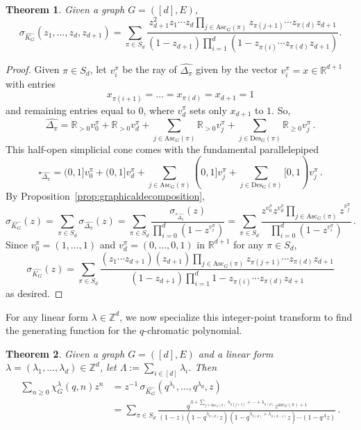 \documentclass[11pt]{amsart}
\newtheorem{theorem}{Theorem}  [section] \numberwithin{equation}{section}
\newcommand{\des}{\mathrm{Des}}
\newcommand{\asc}{\mathrm{Asc}}
\newcommand{\ascnum}{\mathrm{asc}}
\begin{document}
\begin{theorem}\label{thm:multivariablechromaticgenerating}
    Given a graph $G=([d],E)$, 
    \[
        \sigma_{\widehat{K_G}}(z_1,\ldots,z_d,z_{d+1}) = \sum_{\pi \in S_d} \frac{ z_{d+1}^2 z_1 \cdots z_d \prod_{j \in \asc_G(\pi)} z_{\pi(j+1)} \cdots z_{\pi(d)} z_{d+1} }{(1-z_{d+1}) \prod_{i=1}^d (1-z_{\pi(i)} \cdots z_{\pi(d)} z_{d+1})}.
    \]
\end{theorem}

\begin{proof}
    Given $\pi \in S_d$, let $v^\pi_i$ be the ray of $\widehat{\Delta_\pi}$ given by the vector $v^\pi_i=x\in \mathbb{R}^{d+1}$ with entries 
    \[
    x_{\pi(i+1)} =\dots = x_{\pi(d)} = x_{d+1} = 1
    \]
    and remaining entries equal to $0$, where $v^\pi_d$ sets only $x_{d+1}$ to $1$. 
    So, 
        \[
            \widehat{\Delta_\pi} = \mathbb{R}_{>0} v^\pi_0 + \mathbb{R}_{>0} v^\pi_d + \sum_{j \in
            \asc_G(\pi)}\mathbb{R}_{>0} v^\pi_j + \sum_{j \in \des_G(\pi)} \mathbb{R}_{\geq 0} v^\pi_j \, .
        \]
    This half-open simplicial cone comes with the fundamental parallelepiped 
    \[
        \square_{\widehat{\Delta_\pi}} = (0,1] v^\pi_0 + (0,1]v^\pi_d + \sum_{j \in \asc_G(\pi)} (0,1]
        v^\pi_j + \sum_{j \in \des_G(\pi)} [0,1) v^\pi_j  \, .
    \]
    By Proposition~\ref{prop:graphicaldecomposition},
    \[
        \sigma_{\widehat{K_G}}(z) = \sum_{\pi \in S_d} \sigma_{\widehat{\Delta_\pi}}(z) = \sum_{\pi \in S_d}
\frac{\sigma_{\square_{\widehat{\Delta_\pi}}}(z)}{\prod_{i=0}^d (1-z^{v^\pi_i}) } = \sum_{\pi \in S_d}
\frac{z^{v^\pi_0} z^{v^\pi_d} \prod_{j \in \asc_G(\pi)} z^{v^\pi_j}} {\prod_{i=0}^d (1-z^{v^\pi_i}) } \, .
    \]
    Since $v^\pi_0= (1,\ldots,1)$ and $v^\pi_d = (0,\ldots,0,1)$ in $\mathbb{R}^{d+1}$ for any $\pi \in S_d$,
    \[
        \sigma_{\widehat{K_G}}(z) = \sum_{\pi \in S_d} \frac{(z_1 \cdots z_{d+1} ) (z_{d+1}) \prod_{j \in \asc_G(\pi)} z_{\pi(j+1)} \cdots z_{\pi(d)} z_{d+1}} {(1-z_{d+1}) \prod_{i=1}^d 1-z_{\pi(i)} \cdots z_{\pi(d)} z_{d+1}}
    \]
    as desired.
\end{proof}

For any linear form $\lambda \in \mathbb{Z}^d$, we now specialize this integer-point transform to find the generating function for the $q$-chromatic polynomial.


\begin{theorem}\label{thm:genfuncweighted}
    Given a graph $G = ([d],E)$ and a linear form $\lambda=(\lambda_1,\ldots,\lambda_d) \in \mathbb{Z}^d$, let
 $\Lambda := \sum_{i \in [d]} \lambda_i$. Then
\begin{align*}
        \sum_{n \geq 0} \chi^\lambda_G(q,n) z^n
        &= z^{-1} \, \sigma_{\widehat{K_G}}(q^{\lambda_1},\ldots,q^{\lambda_d},z) \\
        &= \sum_{\pi \in S_d} \frac{q^{\Lambda + \sum_{j \in \asc_G(\pi)} \lambda_{\pi(j+1)} + \cdots + \lambda_{\pi(d)}} z^{\ascnum_G(\pi)+1} }{(1-z)(1-q^{\lambda_{\pi(d)}}z) (1-q^{\lambda_{\pi(d)} + \lambda_{\pi(d-1)} } z) \cdots (1-q^\Lambda z)}  \, .
\end{align*} 

\end{theorem}
\end{document}
